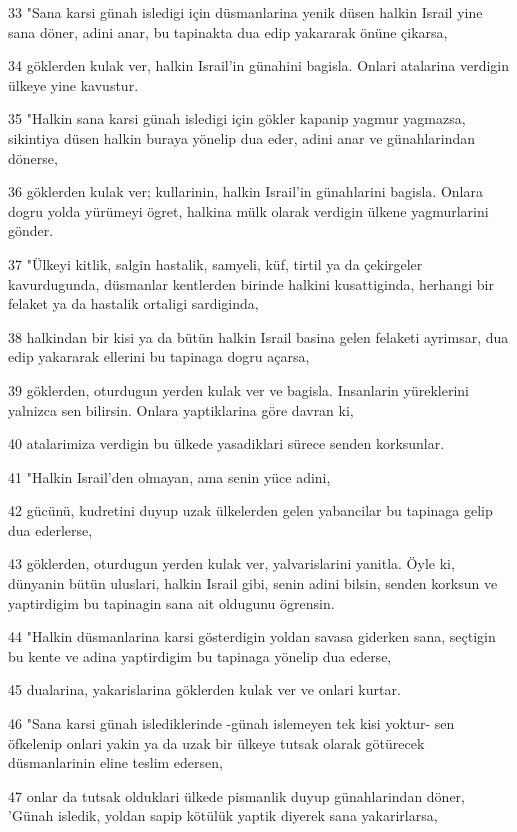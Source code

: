 \par 33 "Sana karsi günah isledigi için düsmanlarina yenik düsen halkin Israil yine sana döner, adini anar, bu tapinakta dua edip yakararak önüne çikarsa,
\par 34 göklerden kulak ver, halkin Israil'in günahini bagisla. Onlari atalarina verdigin ülkeye yine kavustur.
\par 35 "Halkin sana karsi günah isledigi için gökler kapanip yagmur yagmazsa, sikintiya düsen halkin buraya yönelip dua eder, adini anar ve günahlarindan dönerse,
\par 36 göklerden kulak ver; kullarinin, halkin Israil'in günahlarini bagisla. Onlara dogru yolda yürümeyi ögret, halkina mülk olarak verdigin ülkene yagmurlarini gönder.
\par 37 "Ülkeyi kitlik, salgin hastalik, samyeli, küf, tirtil ya da çekirgeler kavurdugunda, düsmanlar kentlerden birinde halkini kusattiginda, herhangi bir felaket ya da hastalik ortaligi sardiginda,
\par 38 halkindan bir kisi ya da bütün halkin Israil basina gelen felaketi ayrimsar, dua edip yakararak ellerini bu tapinaga dogru açarsa,
\par 39 göklerden, oturdugun yerden kulak ver ve bagisla. Insanlarin yüreklerini yalnizca sen bilirsin. Onlara yaptiklarina göre davran ki,
\par 40 atalarimiza verdigin bu ülkede yasadiklari sürece senden korksunlar.
\par 41 "Halkin Israil'den olmayan, ama senin yüce adini,
\par 42 gücünü, kudretini duyup uzak ülkelerden gelen yabancilar bu tapinaga gelip dua ederlerse,
\par 43 göklerden, oturdugun yerden kulak ver, yalvarislarini yanitla. Öyle ki, dünyanin bütün uluslari, halkin Israil gibi, senin adini bilsin, senden korksun ve yaptirdigim bu tapinagin sana ait oldugunu ögrensin.
\par 44 "Halkin düsmanlarina karsi gösterdigin yoldan savasa giderken sana, seçtigin bu kente ve adina yaptirdigim bu tapinaga yönelip dua ederse,
\par 45 dualarina, yakarislarina göklerden kulak ver ve onlari kurtar.
\par 46 "Sana karsi günah islediklerinde -günah islemeyen tek kisi yoktur- sen öfkelenip onlari yakin ya da uzak bir ülkeye tutsak olarak götürecek düsmanlarinin eline teslim edersen,
\par 47 onlar da tutsak olduklari ülkede pismanlik duyup günahlarindan döner, 'Günah isledik, yoldan sapip kötülük yaptik diyerek sana yakarirlarsa,

